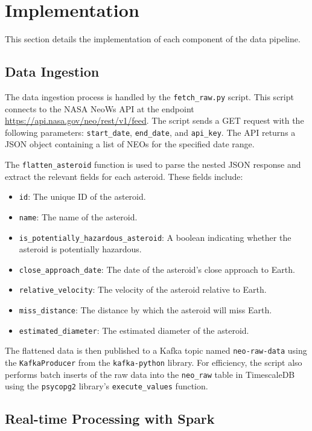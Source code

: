 \documentclass{article}
\begin{document}
\section{Implementation}

This section details the implementation of each component of the data pipeline.

\subsection{Data Ingestion}

The data ingestion process is handled by the \texttt{fetch\_raw.py} script. This script connects to the NASA NeoWs API at the endpoint \url{https://api.nasa.gov/neo/rest/v1/feed}. The script sends a GET request with the following parameters: \texttt{start\_date}, \texttt{end\_date}, and \texttt{api\_key}. The API returns a JSON object containing a list of NEOs for the specified date range.

The \texttt{flatten\_asteroid} function is used to parse the nested JSON response and extract the relevant fields for each asteroid. These fields include:
\begin{itemize}
    \item \texttt{id}: The unique ID of the asteroid.
    \item \texttt{name}: The name of the asteroid.
    \item \texttt{is\_potentially\_hazardous\_asteroid}: A boolean indicating whether the asteroid is potentially hazardous.
    \item \texttt{close\_approach\_date}: The date of the asteroid's close approach to Earth.
    \item \texttt{relative\_velocity}: The velocity of the asteroid relative to Earth.
    \item \texttt{miss\_distance}: The distance by which the asteroid will miss Earth.
    \item \texttt{estimated\_diameter}: The estimated diameter of the asteroid.
\end{itemize}

The flattened data is then published to a Kafka topic named \texttt{neo-raw-data} using the \texttt{KafkaProducer} from the \texttt{kafka-python} library. For efficiency, the script also performs batch inserts of the raw data into the \texttt{neo\_raw} table in TimescaleDB using the \texttt{psycopg2} library's \texttt{execute\_values} function.

\subsection{Real-time Processing with Spark}
\end{document}
